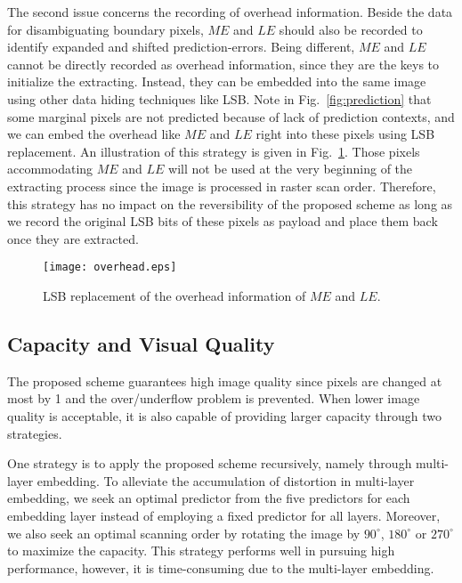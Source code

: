 \documentclass{sig-alternate}
\begin{document}
The second issue concerns the recording of overhead information. Beside the data for disambiguating
boundary pixels, $\mathit{ME}$ and $\mathit{LE}$ should also be recorded to identify expanded and
shifted prediction-errors. Being different, $\mathit{ME}$ and $\mathit{LE}$ cannot be directly
recorded as overhead information, since they are the keys to initialize the extracting. Instead,
they can be embedded into the same image using other data hiding techniques like LSB. Note in Fig.\
\ref{fig:prediction} that some marginal pixels are not predicted because of lack of prediction
contexts, and we can embed the overhead like $\mathit{ME}$ and $\mathit{LE}$ right into these pixels
using LSB replacement. An illustration of this strategy is given in Fig.\ \ref{fig:overhead}. Those
pixels accommodating $\mathit{ME}$ and $\mathit{LE}$ will not be used at the very beginning of the
extracting process since the image is processed in raster scan order. Therefore, this strategy has
no impact on the reversibility of the proposed scheme as long as we record the original LSB bits of
these pixels as payload and place them back once they are extracted.

\begin{figure}[t]
  \centering
  \texttt{[image: overhead.eps]}
  \caption{\label{fig:overhead}LSB replacement of the overhead information of $\mathit{ME}$ and $\mathit{LE}$.}
\end{figure}

\subsection{Capacity and Visual Quality}
The proposed scheme guarantees high image quality since pixels are changed at most by 1 and the
over/underflow problem is prevented. When lower image quality is acceptable, it is also capable of
providing larger capacity through two strategies.

One strategy is to apply the proposed scheme recursively, namely through multi-layer embedding. To
alleviate the accumulation of distortion in multi-layer embedding, we seek an optimal predictor from
the five predictors for each embedding layer instead of employing a fixed predictor for all layers.
Moreover, we also seek an optimal scanning order by rotating the image by $90^\circ$, $180^\circ$ or
$270^\circ$ to maximize the capacity. This strategy performs well in pursuing high performance,
however, it is time-consuming due to the multi-layer embedding.
\end{document}
